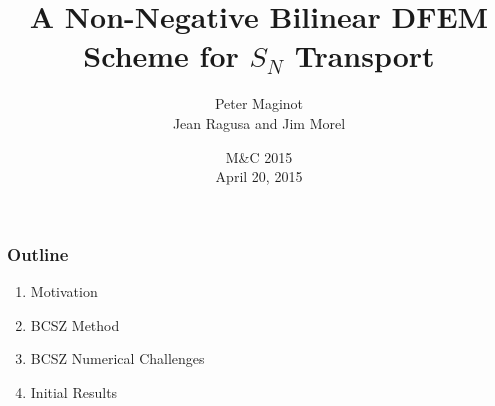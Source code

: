 \documentclass{beamer}
\title{A Non-Negative Bilinear DFEM Scheme for $S_N$ Transport}
\author{Peter Maginot \\ Jean Ragusa and Jim Morel}\institute{Texas A\&M University- Department of Nuclear Engineering}
\date{M\&C 2015 \\ April 20, 2015 }
\newif\ifplacelogo %
\begin{document}
\placelogotrue
\begin{frame}
\titlepage


\end{frame}


\placelogofalse

\begin{frame}
\frametitle{Outline}

\begin{enumerate}
\item Motivation
\item BCSZ Method
\item BCSZ Numerical Challenges
\item Initial Results
\end{enumerate}

\end{frame}


%
\end{document}
